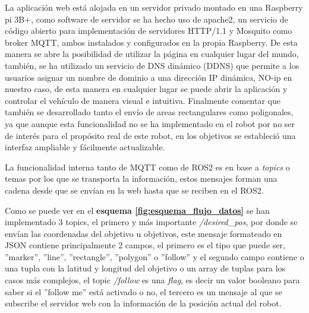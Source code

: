 La aplicación web está alojada en un servidor privado montado en una Raspberry pi 3B+, como software de servidor se ha hecho uso de apache2, 
un servicio de código abierto para implementación de servidores HTTP/1.1 y Mosquito como broker MQTT, ambos instalados y configurados en la propia 
Raspberry. De esta manera se abre la posibilidad de utilizar la página en cualquier lugar del mundo, también, se ha utilizado un servicio de DNS dinámico (DDNS) 
que permite a los usuarios asignar un nombre de dominio a una dirección IP dinámica, NO-ip en nuestro caso, de esta manera en cualquier 
lugar se puede abrir la aplicación y controlar el vehículo de manera visual e intuitiva. Finalmente
comentar que también se desarrollado tanto el envío de areas rectangulares como poligonales, ya que aunque esta 
funcionalidad no se ha implementado en el robot por no ser de interés para el propósito real de este robot, en los objetivos se estableció 
una interfaz ampliable y fácilmente actualizable.


La funcionalidad interna tanto de MQTT como de ROS2 es en base a \textit{topics} o temas por los que se transporta la información, estos 
mensajes forman una cadena desde que se envían en la web hasta que se reciben en el ROS2.

Como se puede ver en el \textbf{esquema \ref{fig:esquema_flujo_datos}} se han implementado 3 topics, el primero y más importante 
\textit{/desired\_pos}, por donde se envían las coordenadas del objetivo u objetivos, este mensaje formateado en JSON contiene principalmente 2 
campos, el primero es el tipo que puede ser, ''marker'', ''line'', ''rectangle'', ''polygon'' o ''follow'' y el segundo campo contiene o 
una tupla con la latitud y longitud del objetivo o un array de tuplas para los casos más complejos, el topic \textit{/follow} es una \textit{flag}, 
es decir un valor booleano para saber si el ''follow me'' está activado o no, el tercero es un mensaje al que se subscribe el servidor web con 
la información de la posición actual del robot.

